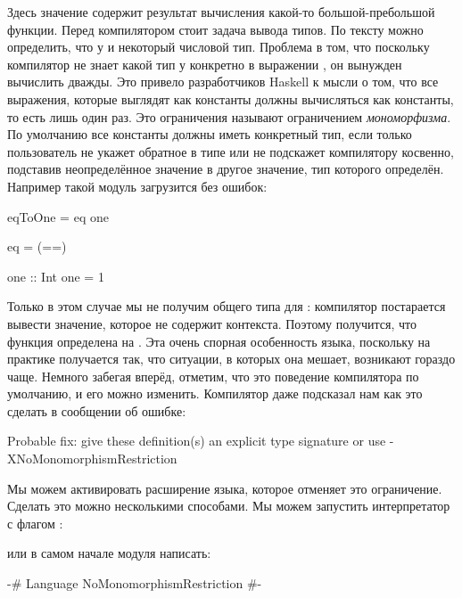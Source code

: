 Здесь значение  содержит результат вычисления
какой-то большой-пребольшой функции. Перед компилятором 
стоит задача вывода типов. По тексту можно определить,
что у  и  некоторый числовой тип. 
Проблема в том, что поскольку компилятор не знает какой тип
у  конкретно в выражении , он вынужден
вычислить  дважды. Это привело разработчиков 
Haskell к мысли о том, что все выражения, которые
выглядят как константы должны вычисляться как константы,
то есть лишь один раз. 
Это ограничения называют ограничением \emph{мономорфизма}.
По умолчанию все константы должны иметь конкретный тип, если 
только пользователь не укажет обратное в типе
или не подскажет компилятору косвенно, подставив
неопределённое значение в другое значение, тип которого
определён. Например такой модуль загрузится без ошибок:

\begin{code}
eqToOne = eq one

eq = (==)

one :: Int
one = 1
\end{code}

Только в этом случае мы не получим общего типа для 
: компилятор постарается вывести значение,
которое не содержит контекста. Поэтому получится, что
функция   определена на .
Эта очень спорная особенность языка, поскольку
на практике получается так, что ситуации, в которых
она мешает, возникают гораздо чаще. Немного забегая вперёд, отметим, что
это поведение компилятора по умолчанию, и его можно
изменить. Компилятор даже подсказал нам как это сделать
в сообщении об ошибке:

\begin{code}
    Probable fix: give these definition(s) an explicit type signature
                  or use -XNoMonomorphismRestriction
\end{code}

Мы можем активировать расширение языка, которое отменяет
это ограничение. Сделать это можно несколькими способами.
Мы можем запустить интерпретатор с флагом :


\noindent или в самом начале модуля написать:

\begin{code}
{-# Language NoMonomorphismRestriction #-}
\end{code}

